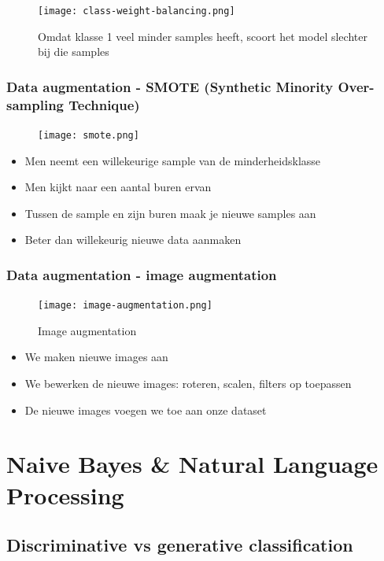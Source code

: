 \documentclass{article}
\begin{document}
\begin{figure}[H]
    \centering
    \texttt{[image: class-weight-balancing.png]}
    \caption{Omdat klasse 1 veel minder samples heeft, scoort het model slechter bij die samples}
\end{figure}

\subsubsection{Data augmentation - SMOTE (Synthetic Minority Over-sampling Technique)}

\begin{figure}[H]
    \centering
    \texttt{[image: smote.png]}
\end{figure}

\begin{itemize}
    \item Men neemt een willekeurige sample van de minderheidsklasse
    \item Men kijkt naar een aantal buren ervan
    \item Tussen de sample en zijn buren maak je nieuwe samples aan
    \item Beter dan willekeurig nieuwe data aanmaken
\end{itemize}

\subsubsection{Data augmentation - image augmentation}

\begin{figure}[H]
    \centering
    \texttt{[image: image-augmentation.png]}
    \caption{Image augmentation}
\end{figure}

\begin{itemize}
    \item We maken nieuwe images aan
    \item We bewerken de nieuwe images: roteren, scalen, filters op toepassen
    \item De nieuwe images voegen we toe aan onze dataset
\end{itemize}

\section{Naive Bayes \& Natural Language Processing}
\subsection{Discriminative vs generative classification}
\end{document}
